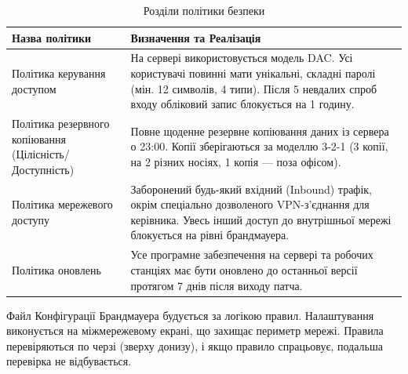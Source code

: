\begin{table}[h!]
    \caption{Розділи політики безпеки}
    \label{tab:appendv_yur}
    \begin{tabular}{|>{\raggedright\arraybackslash}p{5.5cm}|>{\raggedright\arraybackslash}p{9.5cm}|}
        \hline
        \textbf{Назва політики} & \textbf{Визначення та Реалізація} \\
        \hline
        Політика керування доступом & На сервері використовується модель DAC. Усі користувачі повинні мати унікальні, складні паролі (мін. 12 символів, 4 типи). Після 5 невдалих спроб входу обліковий запис блокується на 1 годину. \\
        \hline
        Політика резервного копіювання (Цілісність/Доступність) & Повне щоденне резервне копіювання даних із сервера о 23:00. Копії зберігаються за моделлю 3-2-1 (3 копії, на 2 різних носіях, 1 копія — поза офісом). \\
        \hline
        Політика мережевого доступу & Заборонений будь-який вхідний (Inbound) трафік, окрім спеціально дозволеного VPN-з'єднання для керівника. Увесь інший доступ до внутрішньої мережі блокується на рівні брандмауера. \\
        \hline
        Політика оновлень & Усе програмне забезпечення на сервері та робочих станціях має бути оновлено до останньої версії протягом 7 днів після виходу патча. \\
        \hline
    \end{tabular}
\end{table}

Файл Конфігурації Брандмауера будується за логікою правил. Налаштування виконується на міжмережевому екрані, що захищає периметр мережі. Правила перевіряються по черзі (зверху донизу), і якщо правило спрацьовує, подальша перевірка не відбувається.

